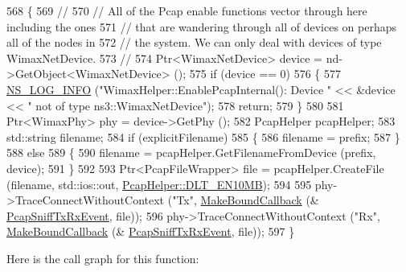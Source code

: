 \begin{DoxyCode}
568 \{
569   \textcolor{comment}{//}
570   \textcolor{comment}{// All of the Pcap enable functions vector through here including the ones}
571   \textcolor{comment}{// that are wandering through all of devices on perhaps all of the nodes in}
572   \textcolor{comment}{// the system.  We can only deal with devices of type WimaxNetDevice.}
573   \textcolor{comment}{//}
574   Ptr<WimaxNetDevice> device = nd->GetObject<WimaxNetDevice> ();
575   \textcolor{keywordflow}{if} (device == 0)
576     \{
577       \hyperlink{group__logging_gafbd73ee2cf9f26b319f49086d8e860fb}{NS\_LOG\_INFO} (\textcolor{stringliteral}{"WimaxHelper::EnablePcapInternal(): Device "} << &device << \textcolor{stringliteral}{" not of type
       ns3::WimaxNetDevice"});
578       \textcolor{keywordflow}{return};
579     \}
580 
581   Ptr<WimaxPhy> phy = device->GetPhy ();
582   PcapHelper pcapHelper;
583   std::string filename;
584   \textcolor{keywordflow}{if} (explicitFilename)
585     \{
586       filename = prefix;
587     \}
588   \textcolor{keywordflow}{else}
589     \{
590       filename = pcapHelper.GetFilenameFromDevice (prefix, device);
591     \}
592 
593   Ptr<PcapFileWrapper> file = pcapHelper.CreateFile (filename, std::ios::out, 
      \hyperlink{classns3_1_1PcapHelper_a2ee4dad28ddd9a1fe636f51835eaa77fafcc9f108717302f66800b8ea731e0ca0}{PcapHelper::DLT\_EN10MB});
594 
595   phy->TraceConnectWithoutContext (\textcolor{stringliteral}{"Tx"}, \hyperlink{group__makeboundcallback_ga1725d6362e6065faa0709f7c93f8d770}{MakeBoundCallback} (&
      \hyperlink{namespacens3_a115574906966df73c11f9d03b10c71fd}{PcapSniffTxRxEvent}, file));
596   phy->TraceConnectWithoutContext (\textcolor{stringliteral}{"Rx"}, \hyperlink{group__makeboundcallback_ga1725d6362e6065faa0709f7c93f8d770}{MakeBoundCallback} (&
      \hyperlink{namespacens3_a115574906966df73c11f9d03b10c71fd}{PcapSniffTxRxEvent}, file));
597 \}
\end{DoxyCode}


Here is the call graph for this function\+:


